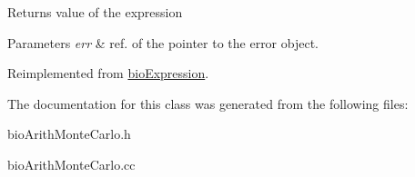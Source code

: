 \begin{DoxyReturn}{Returns}
value of the expression 
\end{DoxyReturn}

\begin{DoxyParams}{Parameters}
{\em err} & ref. of the pointer to the error object. \\
\hline
\end{DoxyParams}


Reimplemented from \hyperlink{classbio_expression_af58662a5d4d456f15bc4f2c9bd4f8a5b}{bio\+Expression}.



The documentation for this class was generated from the following files\+:\begin{DoxyCompactItemize}
\item 
bio\+Arith\+Monte\+Carlo.\+h\item 
bio\+Arith\+Monte\+Carlo.\+cc\end{DoxyCompactItemize}

